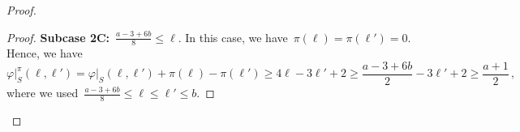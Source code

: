 \documentclass[10pt,a4paper]{amsart}
\newenvironment{claimproof}[1][Proof]{
	\renewcommand{\oldqed}{\qedsymbol}
	\renewcommand{\qedsymbol}{\endofClaim}
	\begin{proof}[#1]
	}{
	\end{proof}
	\renewcommand{\qedsymbol}{\oldqed}
}
\newcommand{\f}{\varphi}
\newcommand{\w}{\f\vert_S}
\begin{document}
\begin{proof}
\begin{claimproof}
			\textbf{Subcase 2C:}~$\frac{a-3+6b}{8}\le\ell$. In this case, we have~$\pi(\ell)=\pi(\ell')=0$. Hence, we have
			\[ \w^\pi(\ell,\ell')= \w(\ell,\ell')+\pi(\ell)-\pi(\ell') \ge 4\ell-3\ell'+2 \ge \frac{a-3+6b}{2}-3\ell'+2 \ge \frac{a+1}{2}\,, \]
			where we used~$\frac{a-3+6b}{8}\le\ell\le\ell'\le b$.
		\end{claimproof}
	\end{proof}
\end{document}
